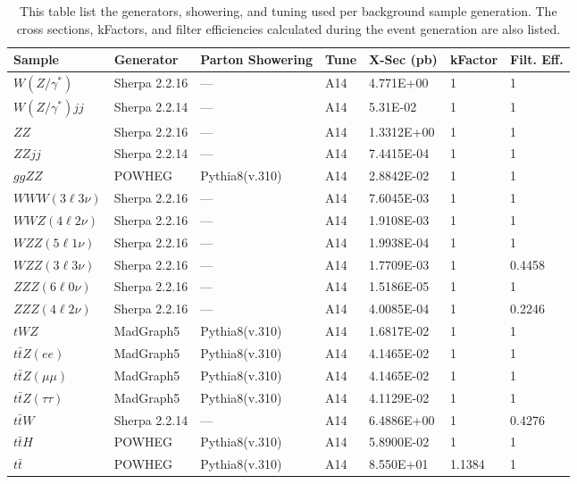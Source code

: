 \begin{table}
  \centering
  \begin{tabular}{l|l|l|l|l|l|l}
    \hline
    Sample & Generator & Parton Showering & Tune & X-Sec (pb) & kFactor & Filt. Eff. \\
    \hline
    $W(Z/\gamma^{*})$ & Sherpa 2.2.16 & --- & A14 & 4.771E+00 & 1 & 1 \\
    $W(Z/\gamma^{*})jj$ & Sherpa 2.2.14 & --- & A14 & 5.31E-02 & 1 & 1 \\
    $ZZ$ & Sherpa 2.2.16 & --- & A14 & 1.3312E+00 & 1 & 1 \\
    $ZZjj$ & Sherpa 2.2.14 & --- & A14 & 7.4415E-04 & 1 & 1 \\
    $ggZZ$ & POWHEG & Pythia8(v.310) & A14 & 2.8842E-02 & 1 & 1 \\
    $WWW(3\ell 3\nu)$ & Sherpa 2.2.16 & --- & A14 & 7.6045E-03 & 1 & 1 \\
    $WWZ(4\ell 2\nu)$ & Sherpa 2.2.16 & --- & A14 & 1.9108E-03 & 1 & 1 \\
    $WZZ(5\ell 1\nu)$ & Sherpa 2.2.16 & --- & A14 & 1.9938E-04 & 1 & 1 \\
    $WZZ(3\ell 3\nu)$ & Sherpa 2.2.16 & --- & A14 & 1.7709E-03 & 1 & 0.4458 \\
    $ZZZ(6\ell 0\nu)$ & Sherpa 2.2.16 & --- & A14 & 1.5186E-05  & 1 & 1 \\
    $ZZZ(4\ell 2\nu)$ & Sherpa 2.2.16 & --- & A14 & 4.0085E-04  & 1 & 0.2246 \\
    $tWZ$ & MadGraph5 & Pythia8(v.310) & A14 & 1.6817E-02  & 1 & 1 \\
    $t\bar{t}Z(ee)$ & MadGraph5 & Pythia8(v.310) & A14 & 4.1465E-02  & 1 & 1 \\
    $t\bar{t}Z(\mu\mu)$ & MadGraph5 & Pythia8(v.310) & A14 & 4.1465E-02  & 1 & 1 \\
    $t\bar{t}Z(\tau\tau)$ & MadGraph5 & Pythia8(v.310) & A14 & 4.1129E-02  & 1 & 1 \\
    $t\bar{t}W$ & Sherpa 2.2.14 & --- & A14 & 6.4886E+00  & 1 & 0.4276 \\
    $t\bar{t}H$ & POWHEG & Pythia8(v.310) & A14 & 5.8900E-02  & 1 & 1 \\
    $t\bar{t}$ & POWHEG & Pythia8(v.310) & A14 & 8.550E+01  & 1.1384 & 1 \\
    \hline
  \end{tabular}
  \caption{This table list the generators, showering, and tuning used per background sample generation. The cross sections, kFactors, and filter efficiencies calculated during the event generation are also listed.}\label{tab:mc_background_samples}
\end{table}